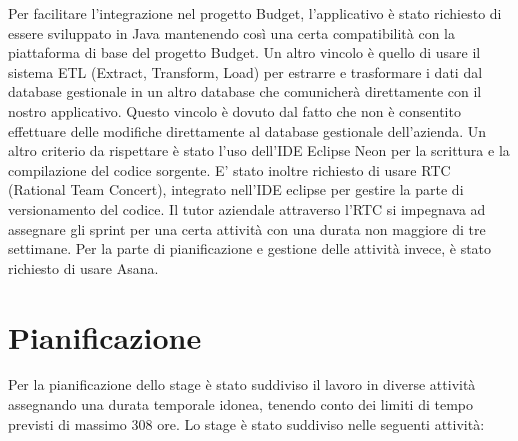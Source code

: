 Per facilitare l'integrazione nel progetto Budget, l'applicativo è stato richiesto di essere sviluppato in Java mantenendo così una certa compatibilità con la piattaforma di base del progetto Budget. Un altro vincolo è quello di usare il sistema ETL (Extract, Transform, Load) per estrarre e trasformare i dati dal database gestionale in un altro database che comunicherà direttamente con il nostro applicativo. Questo vincolo è dovuto dal fatto che non è consentito effettuare delle modifiche direttamente al database gestionale dell'azienda.
Un altro criterio da rispettare è stato l'uso  dell'IDE Eclipse Neon per la scrittura e la compilazione del codice sorgente. E' stato inoltre richiesto di usare RTC (Rational Team Concert), integrato nell'IDE eclipse per gestire la parte di versionamento del codice. Il tutor aziendale attraverso l'RTC si impegnava ad assegnare gli sprint per una certa attività con una durata non maggiore di tre settimane. Per la parte di pianificazione e gestione delle attività invece, è stato richiesto di usare Asana.  \\

\section{Pianificazione}

Per la pianificazione dello stage è stato suddiviso il lavoro in diverse attività assegnando una durata temporale idonea, tenendo conto dei limiti di tempo previsti di massimo 308 ore. Lo stage è stato suddiviso nelle seguenti attività: \\


